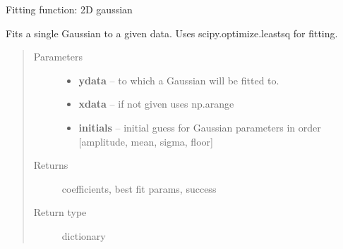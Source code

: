 \documentclass[a4paper,11pt,english]{sphinxmanual}
\begin{document}

\begin{fulllineitems}
\label{analysis:analysis.analyseSpotMeasurements.fitf}
Fitting function: 2D gaussian

\end{fulllineitems}


\begin{fulllineitems}
\label{analysis:analysis.analyseSpotMeasurements.gaussianFit}
Fits a single Gaussian to a given data.
Uses scipy.optimize.leastsq for fitting.
\begin{quote}\begin{description}
\item[{Parameters}] \leavevmode\begin{itemize}
\item {} 
\textbf{ydata} -- to which a Gaussian will be fitted to.

\item {} 
\textbf{xdata} -- if not given uses np.arange

\item {} 
\textbf{initials} -- initial guess for Gaussian parameters in order {[}amplitude, mean, sigma, floor{]}

\end{itemize}

\item[{Returns}] \leavevmode
coefficients, best fit params, success

\item[{Return type}] \leavevmode
dictionary

\end{description}\end{quote}

\end{fulllineitems}

\end{document}
